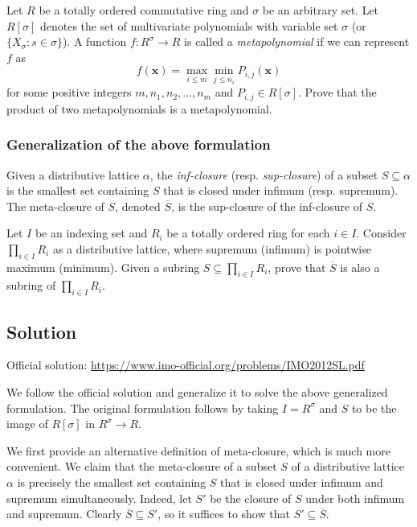 Let $R$ be a totally ordered commutative ring and $\sigma$ be an arbitrary set.
Let $R[\sigma]$ denotes the set of multivariate polynomials with variable set $\sigma$ (or $\{X_{\sigma} : s \in \sigma\}$).
A function $f : R^{\sigma} \to R$ is called a \emph{metapolynomial} if we can represent $f$ as
\[ f(\mathbf{x}) = \max_{i \leq m} \min_{j \leq n_i} P_{i, j}(\mathbf{x}) \]
    for some positive integers $m, n_1, n_2, \ldots, n_m$ and $P_{i, j} \in R[\sigma]$.
Prove that the product of two metapolynomials is a metapolynomial.


\subsubsection*{Generalization of the above formulation}

Given a distributive lattice $\alpha$, the \emph{inf-closure} (resp. \emph{sup-closure}) of a subset $S \subseteq \alpha$ is the smallest set containing $S$ that is closed under infimum (resp. supremum).
The meta-closure of $S$, denoted $\overline{S}$, is the sup-closure of the inf-closure of $S$.

Let $I$ be an indexing set and $R_i$ be a totally ordered ring for each $i \in I$.
Consider $\prod_{i \in I} R_i$ as a distributive lattice, where supremum (infimum) is pointwise maximum (minimum).
Given a subring $S \subseteq \prod_{i \in I} R_i$, prove that $\overline{S}$ is also a subring of $\prod_{i \in I} R_i$.



\subsection*{Solution}

Official solution: \url{https://www.imo-official.org/problems/IMO2012SL.pdf}

We follow the official solution and generalize it to solve the above generalized formulation.
The original formulation follows by taking $I = R^{\sigma}$ and $S$ to be the image of $R[\sigma]$ in $R^{\sigma} \to R$.

We first provide an alternative definition of meta-closure, which is much more convenient.
We claim that the meta-closure of a subset $S$ of a distributive lattice $\alpha$ is precisely the smallest set containing $S$ that is closed under infimum and supremum simultaneously.
Indeed, let $S'$ be the closure of $S$ under both infimum and supremum.
Clearly $\overline{S} \subseteq S'$, so it suffices to show that $S' \subseteq \overline{S}$.

